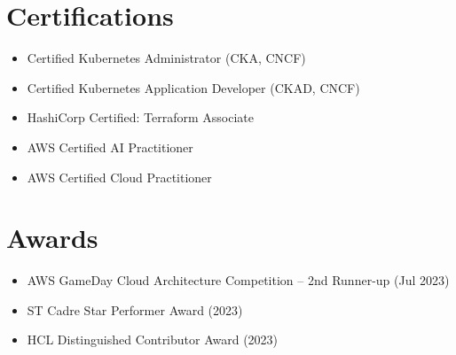 \documentclass[11pt,a4paper]{article}
\newcommand{\sectionItemBegin}{
  \begin{itemize}[left=1.2em, label=\small$\bullet$, itemsep=1pt, parsep=0pt, topsep=0.8pt]
}
\newcommand{\sectionItemEnd}{\end{itemize}}
\begin{document}
\section{Certifications}
  \sectionItemBegin{}
    \item Certified Kubernetes Administrator (CKA, CNCF)
    \item Certified Kubernetes Application Developer (CKAD, CNCF)
    \item HashiCorp Certified: Terraform Associate
    \item AWS Certified AI Practitioner
    \item AWS Certified Cloud Practitioner
  \sectionItemEnd{}

\section{Awards}
  \sectionItemBegin{}
    \item AWS GameDay Cloud Architecture Competition -- 2nd Runner-up (Jul 2023)
    \item ST Cadre Star Performer Award (2023)
    \item HCL Distinguished Contributor Award (2023)
  \sectionItemEnd{}
\end{document}
